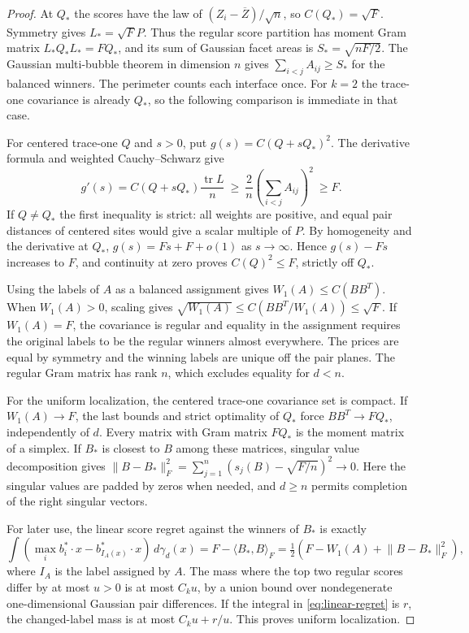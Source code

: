 \documentclass[11pt,reqno]{amsart}
\newcommand{\ip}[2]{\langle #1,#2\rangle}
\newcommand{\norm}[1]{\lVert #1\rVert}
\newcommand{\ga}{\gamma}
\DeclareMathOperator{\tr}{tr}
\begin{document}
\begin{proof}
At $Q_*$ the scores have the law of
$(Z_i-\overline Z)/\sqrt n$, so $C(Q_*)=\sqrt F$.
Symmetry gives $L_*=\sqrt F P$. Thus the regular score partition has
moment Gram matrix $L_*Q_*L_*=FQ_*$, and its sum of Gaussian facet
areas is $S_*=\sqrt{nF/2}$. The Gaussian multi-bubble theorem
\cite[Theorem~1.1]{MN} in dimension $n$ gives
$\sum_{i<j}A_{ij}\ge S_*$ for the balanced winners. The perimeter counts
each interface once. For $k=2$ the trace-one covariance is already
$Q_*$, so the following comparison is immediate in that case.

For centered trace-one $Q$ and $s>0$, put $g(s)=C(Q+sQ_*)^2$.
The derivative formula and weighted Cauchy--Schwarz give
\[
 g'(s)=C(Q+sQ_*)\frac{\tr L}{n}
 \ \ge\ \frac{2}{n}\left(\sum_{i<j}A_{ij}\right)^2\ \ge F.
\]
If $Q\ne Q_*$ the first inequality is strict: all weights are positive,
and equal pair distances of centered sites would give a scalar multiple
of $P$. By homogeneity and the derivative at $Q_*$,
$g(s)=Fs+F+o(1)$ as $s\to\infty$. Hence $g(s)-Fs$ increases to $F$,
and continuity at zero proves $C(Q)^2\le F$, strictly off $Q_*$.

Using the labels of $A$ as a balanced assignment gives
$W_1(A)\le C(BB^T)$. When $W_1(A)>0$, scaling gives
$\sqrt{W_1(A)}\le C(BB^T/W_1(A))\le\sqrt F$.
If $W_1(A)=F$, the covariance is regular and equality in the assignment
requires the original labels to be the regular winners almost
everywhere. The prices are equal by symmetry and the winning labels
are unique off the pair planes. The regular Gram matrix has rank $n$,
which excludes equality for $d<n$.

For the uniform localization, the centered trace-one covariance set is compact.
If $W_1(A)\to F$, the last bounds and strict optimality of $Q_*$ force
$BB^T\to FQ_*$, independently of $d$. Every matrix with Gram matrix
$FQ_*$ is the moment matrix of a simplex. If $B_*$ is closest to $B$
among these matrices, singular value decomposition gives
$\norm{B-B_*}_F^2=\sum_{j=1}^{n}(s_j(B)-\sqrt{F/n})^2\to0$.
Here the singular values are padded by zeros when needed, and $d\ge n$
permits completion of the right singular vectors.

For later use, the linear score regret against the winners of $B_*$
is exactly
\begin{equation}\label{eq:linear-regret}
 \int(\max_i b_i^*\cdot x-b_{I_A(x)}^*\cdot x)\,d\ga_d(x)
    =F-\ip{B_*}{B}_F=\tfrac12(F-W_1(A)+\norm{B-B_*}_F^2),
\end{equation}
where $I_A$ is the label assigned by $A$. The mass where the top two
regular scores differ by at most $u>0$ is at most $C_k u$, by a union
bound over nondegenerate one-dimensional Gaussian pair differences.
If the integral in \eqref{eq:linear-regret} is $r$, the changed-label
mass is at most $C_k u+r/u$. This proves uniform localization.
\end{proof}
\end{document}

